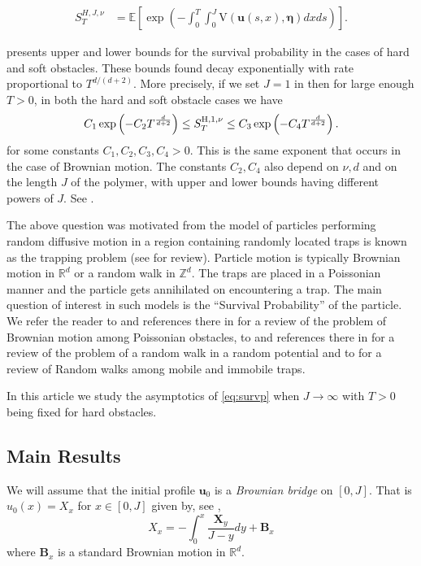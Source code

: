 \documentclass[12pt]{amsart}
\numberwithin{equation}{section}
\theoremstyle{definition}
\numberwithin{equation}{section}
\newcommand{\X}{\mathbf{X}}
\newcommand{\R}{\mathbb{R}}
\newcommand{\Z}{\mathbb{Z}}
\newcommand{\V}{\text{V}}
\newcommand{\E}{\mathbb{E}}
\newcommand{\B}{\mathbf{B}}
\newcommand{\e}{\boldsymbol{\eta}}
\newcommand{\mf}{\mathbf}
\newcommand{\uv}{\mathbf u}
\begin{document}
\begin{equation} \label{eq:survp}
\begin{split}
S^{H,J,\nu}_{T} &=  \E\left[\exp\left(-\int_0^T \int_{0}^J \V\left(\uv(s,x),\e\right)dx ds\right)
\right].
\end{split}
\end{equation}

\cite{ajm23} presents
upper and lower bounds for the survival probability in the cases of hard and soft
obstacles. These bounds found decay exponentially with 
rate proportional to $T^{d/(d+2)}$. More precisely, if we set $J=1$ in 
then for large enough $T>0$, in both the hard and soft obstacle cases we 
have 
\[C_1\exp\left(-C_2 T^{\frac{d}{d+2}}\right) \le S^{\textnormal{H}, 1, \nu}_{T} \le  C_3\exp\left(-C_4 T^{\frac{d}{d+2}}\right).\]
for some constants $C_1,C_2,C_3,C_4 >0$.  This is the same exponent that occurs in the case of
Brownian motion. The constants $C_2,C_4$ also depend on $\nu,d$ and on the length $J$ of
the polymer, with upper and lower bounds having 
different powers of $J$. See \cite[Theorem 1.1 and Theorem 1.3]{ajm23}.


The above question was motivated from the  model of particles performing random diffusive motion in a region containing randomly located traps is known as the trapping problem (see \cite{hol-weiss} for review). Particle motion is typically Brownian motion in $\R^d$ or a random walk in $\Z^d$.  The traps are placed in a Poissonian manner and the particle gets annihilated on encountering a trap. The main question of interest in such models is the ``Survival Probability'' of the particle. We refer the reader to \cite{szn98} and references there in for a review of the problem of Brownian motion among Poissonian obstacles, to \cite{konig} and references there in for a review of  the problem of a random walk in a random potential and to \cite{ads} for a review of Random walks among mobile and immobile traps. 


In this article we study the asymptotics of \eqref{eq:survp} when $J
\rightarrow \infty$ with $T>0$ being fixed for hard obstacles.  
\subsection{Main Results}

We will assume that the initial profile $\mf u_0$ is a {\it Brownian bridge} on $[0,J]$. That is $u_0(x) = X_x$ for $x \in [0,J]$ given by, see \cite[Page 22, (7.5)]{bass97},
\begin{equation} \label{eq:Br_Bridge}
X_x = -\int_{0}^{x}\frac{\X_y}{J-y} dy + \B_x
\end{equation}
where $\B_x$ is a standard Brownian motion in $\R^d$.  
\end{document}
